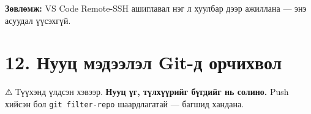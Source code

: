 \textbf{Зөвлөмж:} VS Code Remote-SSH ашиглавал нэг л хуулбар дээр ажиллана --- энэ асуудал үүсэхгүй.

\hypertarget{ux43dux443ux443ux446-ux43cux44dux434ux44dux44dux43bux44dux43b-git-ux434-ux43eux440ux447ux438ux445ux432ux43eux43b}{%
\section{12. Нууц мэдээлэл Git-д орчихвол}\label{ux43dux443ux443ux446-ux43cux44dux434ux44dux44dux43bux44dux43b-git-ux434-ux43eux440ux447ux438ux445ux432ux43eux43b}}

\begin{Shaded}
\begin{Highlighting}[]
\end{Highlighting}
\end{Shaded}

⚠ Түүхэнд үлдсэн хэвээр. \textbf{Нууц үг, түлхүүрийг бүгдийг нь солино.} Push хийсэн бол \texttt{git\ filter-repo} шаардлагатай --- багшид хандана.
